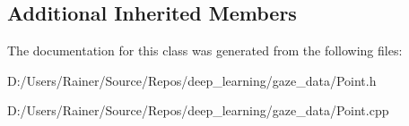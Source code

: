 \subsection*{Additional Inherited Members}


The documentation for this class was generated from the following files\+:\begin{DoxyCompactItemize}
\item 
D\+:/\+Users/\+Rainer/\+Source/\+Repos/deep\+\_\+learning/gaze\+\_\+data/Point.\+h\item 
D\+:/\+Users/\+Rainer/\+Source/\+Repos/deep\+\_\+learning/gaze\+\_\+data/Point.\+cpp\end{DoxyCompactItemize}
